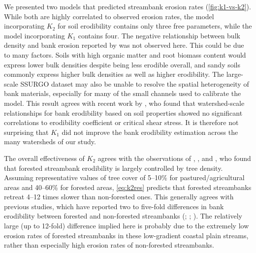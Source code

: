 \documentclass[preprint, review, authoryear, 12pt]{elsarticle}
\begin{document}
We presented two models that predicted streambank erosion rates (\cref{fig:k1-vs-k2}). While both are highly correlated to observed erosion rates, the model incorporating $K_2$ for soil erodibility contains only three free parameters, while the model incorporating $K_1$ contains four. The negative relationship between bulk density and bank erosion reported by \citep{Wynn2006} was not observed here. This could be due to many factors. Soils with high organic matter and root biomass content would express lower bulk densities despite being less erodible overall, and sandy soils commonly express higher bulk densities as well as higher erodibility. The large-scale SSURGO dataset may also be unable to resolve the spatial heterogeneity of bank materials, especially for many of the small channels used to calibrate the model. This result agrees with recent work by \citet{Daly2015}, who found that watershed-scale relationships for bank erodibility based on soil properties showed no significant correlations to erodibility coefficient or critical shear stress. It is therefore not surprising that $K_1$ did not improve the bank erodibility estimation across the many watersheds of our study.

The overall effectiveness of $K_2$ agrees with the observations of \citet{Pizzuto1984}, \citet{Pizzuto1989}, and \citet{Pizzuto2010}, who found that forested streambank erodibility is largely controlled by tree density. Assuming representative values of tree cover of 5--10\% for pastured/agricultural areas and 40--60\% for forested areas, \cref{eq:k2res} predicts that forested streambanks retreat 4--12 times slower than non-forested ones. This generally agrees with previous studies, which have reported two to five-fold differences in bank erodibility between forested and non-forested streambanks (\citealp{Micheli2004}; \citealp{Allmendinger2005}; \citealp{Sass2012}). The relatively large (up to 12-fold) difference implied here is probably due to the extremely low erosion rates of forested streambanks in these low-gradient coastal plain streams, rather than especially high erosion rates of non-forested streambanks.
\end{document}
